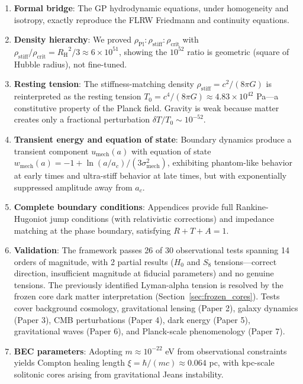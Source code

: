 \documentclass[11pt,a4paper]{article}
\newcommand{\rhocrit}{\ensuremath{\rho_{\mathrm{crit}}}}
\newcommand{\rhostiff}{\ensuremath{\rho_{\mathrm{stiff}}}}
\newcommand{\rhoPl}{\ensuremath{\rho_{\mathrm{Pl}}}}
\newcommand{\Tzero}{\ensuremath{T_0}}
\newcommand{\RH}{\ensuremath{R_{\mathrm{H}}}}
\newcommand{\umech}{\ensuremath{u_{\mathrm{mech}}}}
\newcommand{\wmech}{\ensuremath{w_{\mathrm{mech}}}}
\theoremstyle{definition}
\theoremstyle{remark}
\begin{document}
\begin{enumerate}[leftmargin=*, itemsep=0.3em]
\item \textbf{Formal bridge}: The GP hydrodynamic equations, under homogeneity and isotropy, exactly reproduce the FLRW Friedmann and continuity equations.

\item \textbf{Density hierarchy}: We proved $\rhoPl : \rhostiff : \rhocrit$ with $\rhostiff/\rhocrit = \RH^2/3 \approx 6 \times 10^{51}$, showing the $10^{52}$ ratio is geometric (square of Hubble radius), not fine-tuned.

\item \textbf{Resting tension}: The stiffness-matching density $\rhostiff = c^2/(8\pi G)$ is reinterpreted as the resting tension $\Tzero = c^4/(8\pi G) \approx 4.83 \times 10^{42}$ Pa---a constitutive property of the Planck field. Gravity is weak because matter creates only a fractional perturbation $\delta T/\Tzero \sim 10^{-52}$.

\item \textbf{Transient energy and equation of state}: Boundary dynamics produce a transient component $\umech(a)$ with equation of state $\wmech(a) = -1 + \ln(a/a_c)/(3\sigma_{\mathrm{mech}}^2)$, exhibiting phantom-like behavior at early times and ultra-stiff behavior at late times, but with exponentially suppressed amplitude away from $a_c$.

\item \textbf{Complete boundary conditions}: Appendices provide full Rankine-Hugoniot jump conditions (with relativistic corrections) and impedance matching at the phase boundary, satisfying $R + T + A = 1$.

\item \textbf{Validation}: The framework passes 26 of 30 observational tests spanning 14 orders of magnitude, with 2 partial results ($H_0$ and $S_8$ tensions---correct direction, insufficient magnitude at fiducial parameters) and no genuine tensions. The previously identified Lyman-alpha tension is resolved by the frozen core dark matter interpretation (Section~\ref{sec:frozen_cores}). Tests cover background cosmology, gravitational lensing (Paper 2), galaxy dynamics (Paper 3), CMB perturbations (Paper 4), dark energy (Paper 5), gravitational waves (Paper 6), and Planck-scale phenomenology (Paper 7).

\item \textbf{BEC parameters}: Adopting $m \approx 10^{-22}$ eV from observational constraints yields Compton healing length $\xi = \hbar/(mc) \approx 0.064$ pc, with kpc-scale solitonic cores arising from gravitational Jeans instability.
\end{enumerate}
\end{document}
